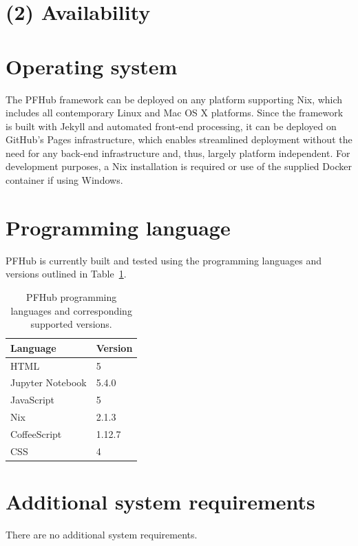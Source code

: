 \documentclass{jors}
\begin{document}
\section*{(2) Availability}
\vspace{0.5cm}
\section*{Operating system}

The PFHub framework can be deployed on any platform supporting Nix,
which includes all contemporary Linux and Mac OS X platforms. Since
the framework is built with Jekyll and automated front-end processing,
it can be deployed on GitHub's Pages infrastructure, which enables
streamlined deployment without the need for any back-end
infrastructure and, thus, largely platform independent. For
development purposes, a Nix installation is required or use of the
supplied Docker container if using Windows.

\section*{Programming language}

PFHub is currently built and tested using the programming languages
and versions outlined in Table~\ref{tab:versions}.

\begin{table}[h!]
  \centering
  \caption{PFHub programming languages and corresponding supported
    versions.}
  \begin{tabular}{|l|l|}
    \hline
    Language         & Version \\
    \hline
    HTML             & 5       \\
    Jupyter Notebook & 5.4.0   \\
    JavaScript       & 5       \\
    Nix              & 2.1.3   \\
    CoffeeScript     & 1.12.7  \\
    CSS              & 4       \\
    \hline
  \end{tabular}
  \label{tab:versions}
\end{table}


\section*{Additional system requirements}

There are no additional system requirements.
\end{document}
